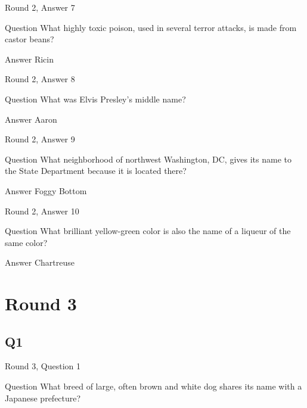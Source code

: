 \documentclass[11pt]{beamer}
\begin{document}
\begin{frame}[t]{Round 2, Answer 7}
\vspace{2em}
\begin{block}{Question}
What highly toxic poison, used in several terror attacks, is made from castor beans\@?
\end{block}
\pause{}
\begin{block}{Answer}
Ricin
\end{block}
\end{frame}
    

\begin{frame}[t]{Round 2, Answer 8}
\vspace{2em}
\begin{block}{Question}
What was Elvis Presley's middle name\@?
\end{block}
\pause{}
\begin{block}{Answer}
Aaron
\end{block}
\end{frame}
    

\begin{frame}[t]{Round 2, Answer 9}
\vspace{2em}
\begin{block}{Question}
What neighborhood of northwest Washington, DC, gives its name to the State Department because it is located there\@?
\end{block}
\pause{}
\begin{block}{Answer}
Foggy Bottom
\end{block}
\end{frame}
    

\begin{frame}[t]{Round 2, Answer 10}
\vspace{2em}
\begin{block}{Question}
What brilliant yellow-green color is also the name of a liqueur of the same color\@?
\end{block}
\pause{}
\begin{block}{Answer}
Chartreuse
\end{block}
\end{frame}
    

\section{Round 3}
    

\subsection*{Q1}
\begin{frame}[t]{Round 3, Question 1}
\vspace{2em}
\begin{block}{Question}
What breed of large, often brown and white dog shares its name with a Japanese prefecture\@?
\end{block}
\end{frame}
    
\end{document}
